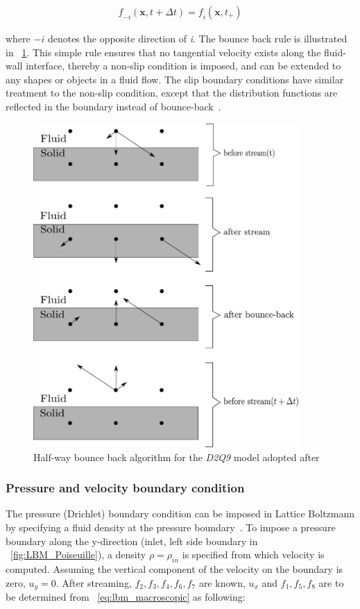 \begin{align}
\mathit{f}_{-\mathit{i}}(\mathbf{x}, \mathit{t}+\Delta \mathit{t}) = 
\mathit{f_i}(\mathbf{x}, \mathit{t}_{+})
\end{align}

where $-\mathit{i}$ denotes the opposite direction of \textit{i}. The bounce 
back rule is illustrated in ~\cref{fig:bounce}. This simple rule ensures that 
no tangential velocity exists along the fluid-wall interface, thereby a 
non-slip condition is imposed, and can be extended to any shapes or objects in 
a fluid flow. The slip boundary conditions have similar treatment to the 
non-slip condition, except that the distribution functions are reflected in the 
boundary instead of bounce-back~\citep{Succi2001}.

\begin{figure}[htbp]
\centering
\includegraphics[width=0.9\textwidth]{bounce}
\caption[Half-way bounce back algorithm for the \textit{D2Q9} model ]{Half-way 
bounce back algorithm for the \textit{D2Q9} model adopted after 
\citet{Sukop2006}}
\label{fig:bounce}
\end{figure}

\subsubsection*{Pressure and velocity boundary condition}
The pressure (Drichlet) boundary condition can be imposed in Lattice Boltzmann 
by specifying a fluid density at the pressure boundary~\citep{Zou1997}. To 
impose a pressure boundary along the y-direction (inlet, left side boundary in 
~\cref{fig:LBM_Poiseuille}), a density $\rho = \rho_{in}$ is specified from 
which velocity is computed. Assuming the vertical component of the velocity on 
the boundary is zero, $u_y=0$. After streaming, $f_2, f_3, f_4, f_6, f_7$ are 
known, $u_x$ and $f_1, f_5, f_8$ are to be determined from 
~\cref{eq:lbm_macroscopic} as following:

